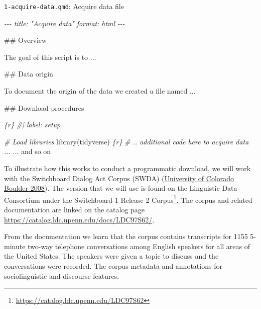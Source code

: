 \documentclass[
  letterpaper,
  DIV=11,
  numbers=noendperiod]{scrreport}
\newenvironment{Shaded}{\begin{snugshade}}{\end{snugshade}}
\newcommand{\AnnotationTok}[1]{\textcolor[rgb]{0.00,0.00,0.00}{\textit{#1}}}
\newcommand{\CommentTok}[1]{\textcolor[rgb]{0.00,0.00,0.00}{\textit{#1}}}
\newcommand{\FunctionTok}[1]{\textcolor[rgb]{0.00,0.00,0.00}{#1}}
\newcommand{\InformationTok}[1]{\textcolor[rgb]{0.00,0.00,0.00}{\textit{#1}}}
\newcommand{\NormalTok}[1]{\textcolor[rgb]{0.00,0.00,0.00}{#1}}
\theoremstyle{definition}
\theoremstyle{remark}
\DeclareRobustCommand{\href}[2]{#2\footnote{\url{#1}}}
\begin{document}
\begin{codelisting}

\caption{\texttt{1-acquire-data.qmd}: Acquire data file}

\hypertarget{lst-ad-swda-acquire-data-qmd}{%
\label{lst-ad-swda-acquire-data-qmd}}%
\begin{Shaded}
\begin{Highlighting}[]
\CommentTok{{-}{-}{-}}
\AnnotationTok{title:}\CommentTok{ "Acquire data"}
\AnnotationTok{format:}\CommentTok{ html}
\CommentTok{{-}{-}{-}}

\FunctionTok{\#\# Overview}

\NormalTok{The goal of this script is to ...}

\FunctionTok{\#\# Data origin}

\NormalTok{To document the origin of the data we created a file named ...}

\FunctionTok{\#\# Download procedures}

\InformationTok{\textasciigrave{}\textasciigrave{}\textasciigrave{}\{r\}}
\CommentTok{\#| label: setup}

\CommentTok{\# Load libraries}
\FunctionTok{library}\NormalTok{(tidyverse)}
\InformationTok{\textasciigrave{}\textasciigrave{}\textasciigrave{}}
\InformationTok{\textasciigrave{}\textasciigrave{}\textasciigrave{}\{r\}}
\CommentTok{\# .. additional code here to acquire data ...}
\InformationTok{\textasciigrave{}\textasciigrave{}\textasciigrave{}}
\NormalTok{... and so on}
\end{Highlighting}
\end{Shaded}

\end{codelisting}

To illustrate how this works to conduct a programmatic download, we will
work with the Switchboard Dialog Act Corpus (SWDA)
(\protect\hyperlink{ref-SWDA2008}{University of Colorado Boulder 2008}).
The version that we will use is found on the Linguistic Data Consortium
under the \href{https://catalog.ldc.upenn.edu/LDC97S62}{Switchboard-1
Release 2 Corpus}. The corpus and related documentation are linked on
the catalog page \url{https://catalog.ldc.upenn.edu/docs/LDC97S62/}.

From the documentation we learn that the corpus contains transcripts for
1155 5-minute two-way telephone conversations among English speakers for
all areas of the United States. The speakers were given a topic to
discuss and the conversations were recorded. The corpus metadata and
annotations for sociolinguistic and discourse features.
\end{document}
